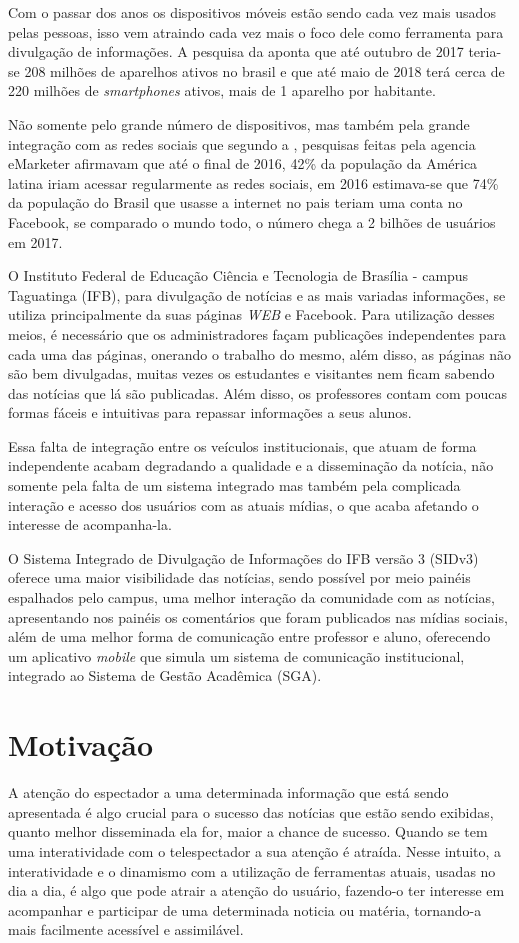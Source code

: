 Com o passar dos anos os dispositivos móveis estão sendo cada vez mais usados pelas pessoas, isso vem atraindo cada vez mais o foco dele como ferramenta para divulgação de informações. A pesquisa da \cite{fgv2017} aponta que até outubro de 2017 teria-se 208 milhões de aparelhos ativos no brasil e que até maio de 2018 terá cerca de 220 milhões de \textit{smartphones} ativos, mais de 1 aparelho por habitante. 

Não somente pelo grande número de dispositivos, mas também pela grande integração com as redes sociais que segundo a \cite{forbes2016}, pesquisas feitas pela agencia eMarketer afirmavam que até o final de 2016, 42\% da população da América latina iriam acessar regularmente as redes sociais, em 2016 estimava-se que 74\% da população do Brasil que usasse a internet no pais teriam uma conta no Facebook, se comparado o mundo todo, o número chega a 2 bilhões de usuários em 2017. 

O Instituto Federal de Educação Ciência e Tecnologia de Brasília - campus Taguatinga (IFB), para divulgação de notícias e as mais variadas informações, se utiliza principalmente da suas páginas \textit{WEB} e Facebook. Para utilização desses meios, é necessário que os administradores façam publicações independentes para cada uma das páginas, onerando o trabalho do mesmo, além disso, as páginas não são bem divulgadas, muitas vezes os estudantes e visitantes nem ficam sabendo das notícias que lá são publicadas. Além disso, os professores contam com poucas formas fáceis e intuitivas para repassar informações a seus alunos.

Essa falta de integração entre os veículos institucionais, que atuam de forma independente acabam degradando a qualidade e a disseminação da notícia, não somente pela falta de um sistema integrado mas também pela complicada interação e acesso dos usuários com as atuais mídias, o que acaba afetando o interesse de acompanha-la.

O Sistema Integrado de Divulgação de Informações do IFB versão 3 (SIDv3) oferece uma maior visibilidade das notícias, sendo possível por meio painéis espalhados pelo campus, uma melhor interação da comunidade com as notícias, apresentando nos painéis os comentários que foram publicados nas mídias sociais, além de uma melhor forma de comunicação entre professor e aluno, oferecendo um aplicativo \textit{mobile} que simula um sistema de comunicação institucional, integrado ao Sistema de Gestão Acadêmica (SGA).

\section{Motivação}
A atenção do espectador a uma determinada informação que está sendo apresentada é algo crucial para o sucesso das notícias que estão sendo exibidas, quanto melhor disseminada ela for, maior a chance de sucesso. Quando se tem uma interatividade com o telespectador a sua atenção é atraída. Nesse intuito, a interatividade e o dinamismo com a utilização de ferramentas atuais, usadas no dia a dia, é algo que pode atrair a atenção do usuário, fazendo-o ter interesse em acompanhar e participar de uma determinada noticia ou matéria, tornando-a mais facilmente acessível e assimilável. 

